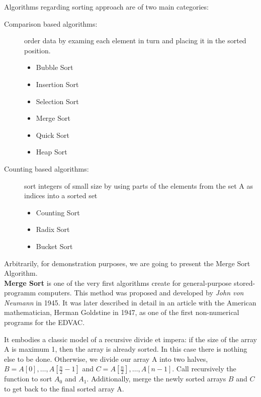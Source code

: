 \documentclass[11pt, letter paper]{article}
\begin{document}
    Algorithms regarding sorting approach are of two main categories:
    \begin{description}
        \item[Comparison based algorithms: ] order data by examing each element in turn and placing it in the sorted position.
            \begin{itemize}
                \item Bubble Sort
                \item Insertion Sort
                \item Selection Sort
                \item Merge Sort
                \item Quick Sort
                \item Heap Sort
            \end{itemize} 

        \item[Counting based algorithms: ] sort integers of small size by using parts of the elements from the set A as indices into a sorted set
            \begin{itemize}
                \item Counting Sort
                \item Radix Sort
                \item Bucket Sort
            \end{itemize}
    \end{description}

    Arbitrarily, for demonstration purposes, we are going to present the Merge Sort Algorithm. \\

    \cite{Eric} \textbf{Merge Sort} is one of the very first algorithms create for general-purpose stored-programm computers. This method was proposed and developed by \emph{John von Neumann} in 1945. It was later described in detail in an article with the American mathematician, Herman Goldstine in 1947, as one of the first non-numerical programs for the EDVAC.

    \cite{Morin} It embodies a classic model of a recursive divide et impera: if the size of the array A is maximum 1, then the array is already sorted. In this case there is nothing else to be done. Otherwise, we divide our array A into two halves, $B = A[0], \dotsc, A[\frac{n}{2} - 1]$ and $C = A[\frac{n}{2}], \dotsc, A[n - 1]$. Call recursively the function to sort $A_0$ and $A_1$. Additionally, merge the newly sorted arrays $B$ and $C$ to get back to the final sorted array A.
\end{document}
